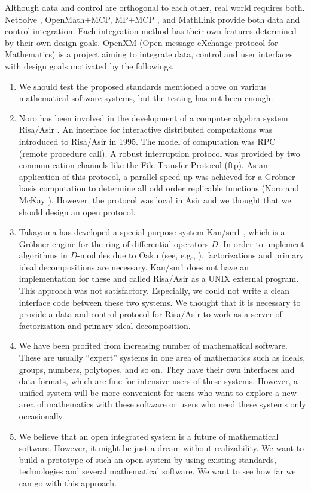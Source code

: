 Although data and control are orthogonal to each other,
real world requires both.
NetSolve \cite{netsolve}, OpenMath$+$MCP, MP$+$MCP \cite{iamc},
and MathLink \cite{mathlink} provide both data and control integration.
Each integration method has their own features determined by their
own design goals.
OpenXM (Open message eXchange protocol for Mathematics)
is a project aiming to integrate data, control and user interfaces
with design goals motivated by the followings.
\begin{enumerate}
\item We should test the proposed standards mentioned above on
various mathematical software systems, but the testing has not been
enough.
\item Noro has been involved in the development of 
a computer algebra system Risa/Asir \cite{asir}.
An interface for interactive distributed computations was introduced
to Risa/Asir 
in 1995.
The model of computation was RPC (remote procedure call).
A robust interruption protocol was provided 
by  two communication channels
like the File Transfer Protocol (ftp).
As an application of this protocol,
a parallel speed-up was achieved for a Gr\"obner basis computation
to determine all odd order replicable functions 
(Noro and McKay \cite{noro-mckay}).
However, the protocol was local in Asir and we thought that we should
design an open protocol.
\item Takayama has developed
a special purpose system Kan/sm1 \cite{kan},
which is a Gr\"obner engine for the ring of differential operators $D$. 
In order to implement algorithms in $D$-modules due to Oaku 
(see, e.g., \cite{sst-book}),
factorizations and primary ideal decompositions are necessary.
Kan/sm1 does not have an implementation for these and called
Risa/Asir as a UNIX external program.
This approach was not satisfactory.
Especially, we could not write a clean interface code between these
two systems.
We thought that it is necessary to provide a data and control protocol
for Risa/Asir to work as a server of factorization and primary ideal
decomposition.
\item We have been profited from increasing number 
of mathematical software.
These are usually ``expert'' systems in one area of mathematics
such as ideals, groups, numbers, polytopes, and so on.
They have their own interfaces and data formats,
which are fine for intensive users of these systems.
However, a unified system will be more convenient
for users who want to explore a new area of mathematics with these
software or users who need these systems only occasionally.

\item  We believe that an open integrated system is a future of mathematical
software.
However, it might be just a dream without realizability.
We want to build a prototype of such an open system by using
existing standards, technologies and several mathematical software.
We want to see how far we can go with this approach.
\end{enumerate}

